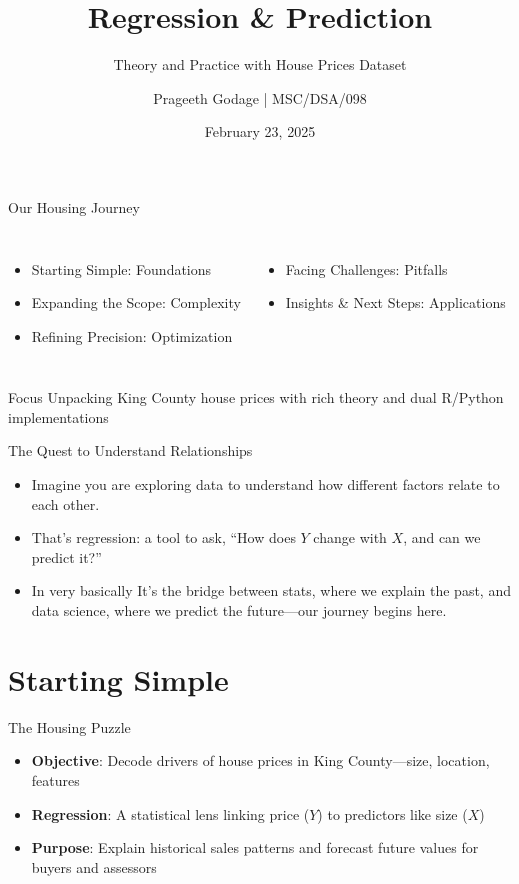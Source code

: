 \documentclass{beamer}
\title{Regression \& Prediction}
\subtitle{Theory and Practice with House Prices Dataset}
\author{Prageeth Godage | MSC/DSA/098}
\institute{USJP}
\date{February 23, 2025}
\begin{document}
	
	\begin{frame}
		\titlepage
	\end{frame}
	
	\begin{frame}{Our Housing Journey}
		\begin{columns}
			\column{0.5\textwidth}
			\begin{itemize}
				\item Starting Simple: Foundations
				\item Expanding the Scope: Complexity
				\item Refining Precision: Optimization
			\end{itemize}
			\column{0.5\textwidth}
			\begin{itemize}
				\item Facing Challenges: Pitfalls
				\item Insights \& Next Steps: Applications
			\end{itemize}
		\end{columns}
		\metroset{block=fill}
		\begin{block}{Focus}
			Unpacking King County house prices with rich theory and dual R/Python implementations
		\end{block}
	\end{frame}
	
	\begin{frame}{The Quest to Understand Relationships}
		\begin{itemize}
			\item Imagine you are exploring data to understand how different factors relate to each other.
			\item That’s regression: a tool to ask, ``How does $Y$ change with $X$, and can we predict it?''
			\item In very basically It’s the bridge between stats, where we explain the past, and data science, where we predict the future—our journey begins here.
		\end{itemize}
	\end{frame}
	
	
	\section{Starting Simple}
	
	\begin{frame}{The Housing Puzzle}
		\begin{itemize}
			\item \textbf{Objective}: Decode drivers of house prices in King County—size, location, features
			\item \textbf{Regression}: A statistical lens linking price ($Y$) to predictors like size ($X$)
			\item \textbf{Purpose}: Explain historical sales patterns and forecast future values for buyers and assessors
		\end{itemize}
	\end{frame}
	
\end{document}
